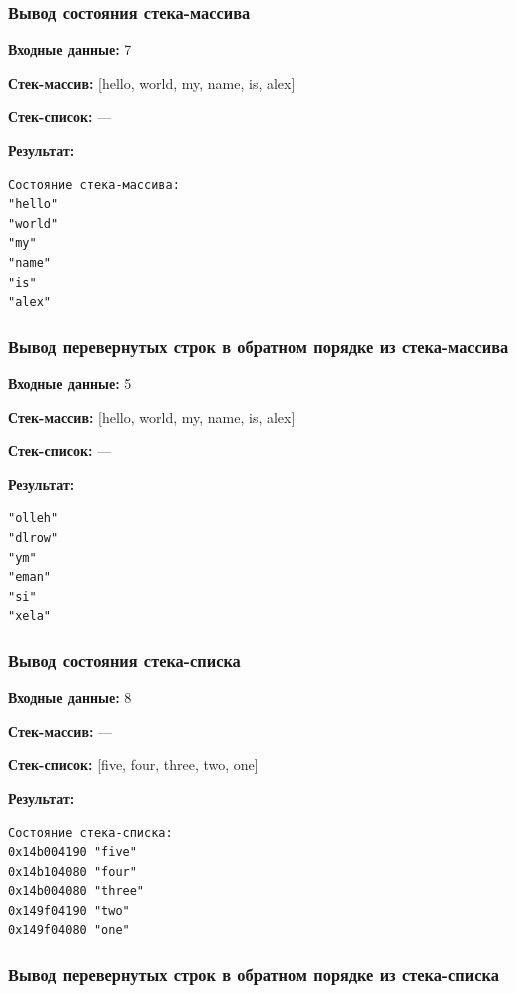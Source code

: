 \documentclass[a4paper,12pt]{extarticle}
\begin{document}
\subsubsection{Вывод состояния стека-массива}

\textbf{Входные данные: }
7

\textbf{Стек-массив: }
[hello, world, my, name, is, alex]

\textbf{Стек-список: }
---

\textbf{Результат: }

\begin{verbatim}
Состояние стека-массива:
"hello"
"world"
"my"
"name"
"is"
"alex"	
\end{verbatim}

\subsubsection{Вывод перевернутых строк в обратном порядке из стека-массива}

\textbf{Входные данные: }
5

\textbf{Стек-массив: }
[hello, world, my, name, is, alex]

\textbf{Стек-список: }
---

\textbf{Результат: }

\begin{verbatim}
"olleh"
"dlrow"
"ym"
"eman"
"si"
"xela"
\end{verbatim}

\subsubsection{Вывод состояния стека-списка}

\textbf{Входные данные: }
8

\textbf{Стек-массив: }
---

\textbf{Стек-список: }
[five, four, three, two, one]

\textbf{Результат: }

\begin{verbatim}
Состояние стека-списка:
0x14b004190 "five"
0x14b104080 "four"
0x14b004080 "three"
0x149f04190 "two"
0x149f04080 "one"
\end{verbatim}

\subsubsection{Вывод перевернутых строк в обратном порядке из стека-списка}
\end{document}
